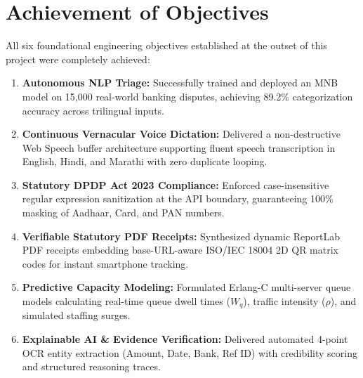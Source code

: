 \section{Achievement of Objectives}
All six foundational engineering objectives established at the outset of this project were completely achieved:
\begin{enumerate}
    \item \textbf{Autonomous NLP Triage:} Successfully trained and deployed an MNB model on 15,000 real-world banking disputes, achieving 89.2\% categorization accuracy across trilingual inputs.
    \item \textbf{Continuous Vernacular Voice Dictation:} Delivered a non-destructive Web Speech buffer architecture supporting fluent speech transcription in English, Hindi, and Marathi with zero duplicate looping.
    \item \textbf{Statutory DPDP Act 2023 Compliance:} Enforced case-insensitive regular expression sanitization at the API boundary, guaranteeing 100\% masking of Aadhaar, Card, and PAN numbers.
    \item \textbf{Verifiable Statutory PDF Receipts:} Synthesized dynamic ReportLab PDF receipts embedding base-URL-aware ISO/IEC 18004 2D QR matrix codes for instant smartphone tracking.
    \item \textbf{Predictive Capacity Modeling:} Formulated Erlang-C multi-server queue models calculating real-time queue dwell times ($W_q$), traffic intensity ($\rho$), and simulated staffing surges.
    \item \textbf{Explainable AI \& Evidence Verification:} Delivered automated 4-point OCR entity extraction (Amount, Date, Bank, Ref ID) with credibility scoring and structured reasoning traces.
\end{enumerate}

